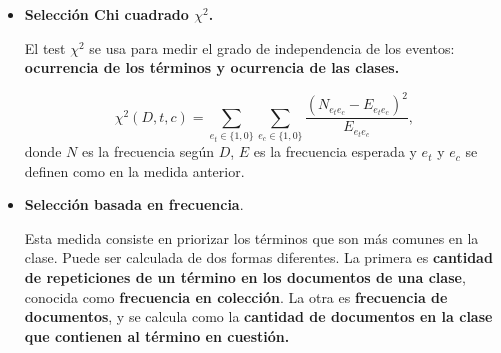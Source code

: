 \documentclass[t,compress,10pt,xcolor=dvipsnames]{beamer}
\begin{document}
{\begin{itemize}
			Computar $A(t,c)$ como el valor esperado de informaci\'on mutua (\emph{Mutual Information} (MI)), da una medida de \textbf{cu\'anta informaci\'on aporta, la presencia en $c$ de un t\'ermino dado, a tomar la decisi\'on correcta de clasificaci\'on de un documento. }
			\[
			I(U_t;C_t) = \sum_{e_t \in \{ 1,0 \} } \sum_{e_c \in \{ 1,0 \} } P( U_t = e_t, C_t = e_c) \log_2 \frac{P (U_t = e_t, C_t = e_c) }{ P(U_t = e_t) P(C_t = e_c) },
			\]
			donde $U_t$ es una variable aleatoria que toma valor $e_t = 1$ si el documento contiene el t\'ermino $t$ y $e_t = 0$ en otro caso, y $C$ es otra variable aleatoria que toma valor $e_c = 1$ si el documento est\'a en la clase $c$ y $e_c = 0  $ en otro caso. 
			
			\smallskip
			
%			
%			
			
		\framebreak
			
			\item\textbf{Selecci\'on Chi cuadrado $\chi^2$.} 
			\smallskip
			
			El test $\chi^2$ se usa para medir el grado de independencia de los eventos: \textbf{ocurrencia de los t\'erminos y ocurrencia de las clases. }
			
			\[
			\chi^2(D,t,c) = \sum_{e_t\in \{ 1, 0 \}} \sum_{e_c\in \{ 1, 0 \}} \frac{(N_{e_te_c} - E_{e_t e_c}) ^2 } { E_{e_t e_c}},
			\]
			donde $N$ es la frecuencia seg\'un $D$, $E$ es la frecuencia esperada y $e_t$ y  $e_c$ se definen como en la medida anterior.
			
			\smallskip
			
		\framebreak
		
			\item \textbf{Selecci\'on basada en frecuencia}.
			\smallskip
			
			Esta medida consiste en priorizar los t\'erminos que son m\'as comunes en la  clase. Puede ser calculada de dos formas diferentes. La primera es\textbf{ cantidad de repeticiones de un t\'ermino en los documentos de una clase}, conocida como \textbf{frecuencia en colecci\'on}. La otra es \textbf{frecuencia de documentos}, y se calcula como la \textbf{cantidad de documentos en la clase que contienen al t\'ermino en cuesti\'on.}
			
%			
			
		\end{itemize}
		
		
	}
\end{document}
